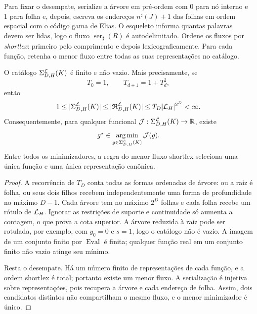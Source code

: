 Para fixar o desempate, serialize a árvore em pré-ordem com $0$ para nó
interno e $1$ para folha e, depois, escreva os endereços
$n^\sharp(J)+1$ das folhas em ordem espacial com o código gama de Elias. O
esqueleto informa quantas palavras devem ser lidas, logo o fluxo
$\operatorname{ser}_\sharp(R)$ é autodelimitado. Ordene os fluxos por
\emph{shortlex}: primeiro pelo comprimento e depois lexicograficamente. Para
cada função, retenha o menor fluxo entre todas as suas representações no
catálogo.

\begin{theorem}\label{map:artigo_2:3.23}
\label{artigo_2:thm:finite-catalog-minimizer}
O catálogo $\Sigma_{D,H}^{\mathcal{L}}(K)$ é finito e não vazio. Mais
precisamente, se
\[
 T_0=1,\qquad T_{d+1}=1+T_d^2,
\]
então
\begin{equation}
 1\le |\Sigma_{D,H}^{\mathcal{L}}(K)|
 \le |\mathfrak R_{D,H}^{\mathcal{L}}(K)|
 \le T_D|\mathcal{L}_H|^{2^D}<\infty.
 \label{artigo_2:eq:finite-catalog-bound}
\end{equation}
Consequentemente, para qualquer funcional
$\mathcal J:\Sigma_{D,H}^{\mathcal{L}}(K)\to\mathbb R$, existe
\begin{equation}
 g^\star\in\operatorname*{arg\,min}_{g\in\Sigma_{D,H}^{\mathcal{L}}(K)}\mathcal J(g).
 \label{artigo_2:eq:finite-argmin}
\end{equation}
Entre todos os minimizadores, a regra do menor fluxo shortlex seleciona uma
única função e uma única representação canônica.
\end{theorem}

\begin{proof}
A recorrência de $T_D$ conta todas as formas ordenadas de árvore: ou a raiz é
folha, ou seus dois filhos recebem independentemente uma forma de profundidade
no máximo $D-1$. Cada árvore tem no máximo $2^D$ folhas e cada folha recebe
um rótulo de $\mathcal{L}_H$. Ignorar as restrições de suporte e continuidade só
aumenta a contagem, o que prova a cota superior. A árvore reduzida à raiz pode
ser rotulada, por exemplo, com $y_0=0$ e $s=1$, logo o catálogo não é vazio.
A imagem de um conjunto finito por $\operatorname{Eval}$ é finita; qualquer
função real em um conjunto finito não vazio atinge seu mínimo.

Resta o desempate. Há um número finito de representações de cada função, e a
ordem shortlex é total; portanto existe um menor fluxo. A serialização é
injetiva sobre representações, pois recupera a árvore e cada endereço de
folha. Assim, dois candidatos distintos não compartilham o mesmo fluxo, e o
menor minimizador é único.
\end{proof}

